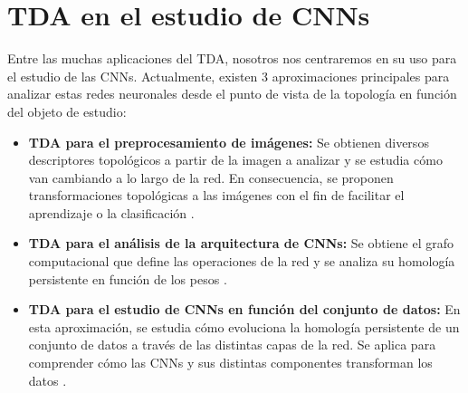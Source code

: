 \section{TDA en el estudio de CNNs}

Entre las muchas aplicaciones del TDA, nosotros nos centraremos en su uso para el
estudio de las CNNs. Actualmente, existen 3 aproximaciones principales para analizar
estas redes neuronales desde el punto de vista de la topología en función del objeto
de estudio:

\begin{itemize}
	\item \textbf{TDA para el preprocesamiento de imágenes:} Se obtienen diversos
	descriptores topológicos a partir de la imagen a analizar y se estudia cómo
	van cambiando a lo largo de la red. En consecuencia, se proponen
	transformaciones topológicas a las imágenes con el fin de facilitar el
	aprendizaje o la clasificación \cite{garin2019topological}.
	
	\item \textbf{TDA para el análisis de la arquitectura de CNNs:} Se obtiene el
	grafo computacional que define las operaciones de la red y se analiza su
	homología persistente en función de los pesos \cite{chowdhury2018persistent}.
	
	\item \textbf{TDA para el estudio de CNNs en función del conjunto de datos:}
	En esta aproximación, se estudia cómo evoluciona la homología persistente de
	un conjunto de datos a través de las distintas capas de la red. Se aplica
	para comprender cómo las CNNs y sus distintas componentes transforman los
	datos \cite{naitzat2020topology}.
\end{itemize}

